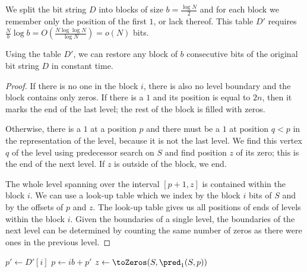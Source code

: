 We split the bit string $D$ into blocks of size $b = \frac{\log N}{2}$ and for each block we remember only the position of the first $1$, or lack thereof.
This table $D'$ requires $\frac{N}{b} \log b = O(\frac{N \log\log N}{\log N}) = o(N)$ bits.

\begin{lemma}
	Using the table $D'$, we can restore any block of $b$ consecutive bits of the original bit string $D$ in constant time.
\end{lemma}
\begin{proof}
	If there is no one in the block $i$, there is also no level boundary and the block contains only zeros.
	If there is a $1$ and its position is equal to $2n$, then it marks the end of the last level; the rest of the block is filled with zeros.

	Otherwise, there is a $1$ at a position $p$ and there must be a $1$ at position $q < p$ in the representation of the level, because it is not the last level.
	We find this vertex $q$ of the level using predecessor search on $S$ and find position $z$ of its zero; this is the end of the next level.
	If $z$ is outside of the block, we end.
	
	The whole level spanning over the interval $[p + 1, z]$ is contained within the block $i$.
	We can use a look-up table \blockOfD{} which we index by the block $i$ bits of $S$ and by the offsets of $p$ and $z$.
	The look-up table gives us all positions of ends of levels within the block $i$.
	Given the boundaries of a single level, the boundaries of the next level can be determined by counting the same number of zeros as there were ones in the previous level.
\end{proof}

\begin{algorithm}
\begin{algorithmic}
 
	\State $p' \gets D'[i]$
	 
		\State {}
	\Else
		\State $p \gets i b + p'$
		 
			\State {} 
		\Else
			\State $z \gets \toZeros(S, \pred_1(S, p))$
			 
				\State {}
			\Else
				\State \Return{$\blockOfD[S[i b : (i + 1) b], p', z \% b]$}
			\EndIf
		\EndIf
	\EndIf
\EndFunction
\end{algorithmic}
\end{algorithm}

